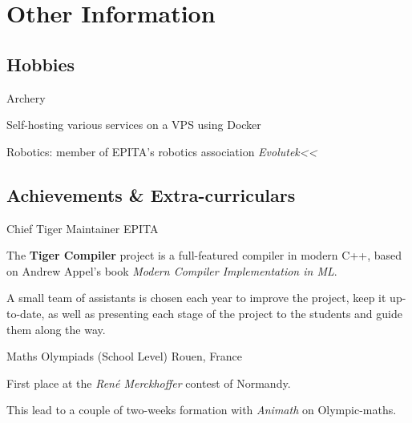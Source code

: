 \documentclass[letterpaper]{twentysecondcv} %
\begin{document}


\section{Other Information}

\subsection{Hobbies}

\begin{twenty}

  \twentyitemshort{}
    {Archery}

  \twentyitemshort{}
    {Self-hosting various services on a VPS using Docker}

  \twentyitemshort{}
    {Robotics: member of EPITA's robotics association \textit{Evolutek<<}}

\end{twenty}

\subsection{Achievements \& Extra-curriculars}

\begin{twenty}

    {Chief Tiger Maintainer}
    {EPITA}
    {The \textbf{Tiger Compiler} project is a full-featured compiler in modern
    C++, based on Andrew Appel's book \textit{Modern Compiler Implementation
    in ML}.

    A small team of assistants is chosen each year to improve the project, keep
    it up-to-date, as well as presenting each stage of the project to the
    students and guide them along the way.}

    {Maths Olympiads (School Level)}
    {Rouen, France}
    {First place at the \textit{René Merckhoffer} contest of Normandy.

    This lead to a couple of two-weeks formation with \textit{Animath} on
    Olympic-maths.}

\end{twenty}

\end{document}
